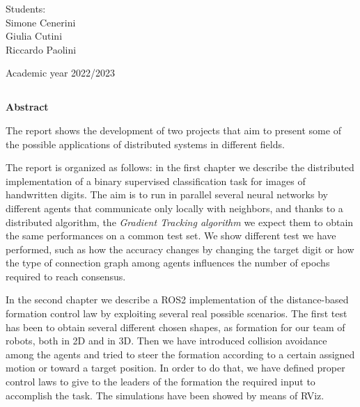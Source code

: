 \documentclass[a4paper,11pt,oneside]{book}
\begin{document}
\begin{flushright}
      {\large Students:}\\
      {Simone Cenerini} \\
      {Giulia Cutini} \\
      {Riccardo Paolini} \\
\end{flushright}        %
\begin{center}
\vfill
      {\large Academic year \@2022/2023} \\
\end{center}



\newpage
\thispagestyle{empty}

\begin{center}
\chapter*{}
\thispagestyle{empty}
{\Huge \textbf{Abstract}}\\
\vspace{15mm}
\end{center}

The report shows the development of two projects that aim to present some of the possible applications of distributed systems in different fields.

\bigskip
The report is organized as follows: in the first chapter we describe the distributed implementation of a binary supervised classification task for images of handwritten digits. The aim is to run in parallel several neural networks by different agents that communicate only locally with neighbors, and thanks to a distributed algorithm, the \textit{Gradient Tracking algorithm} we expect them to obtain the same performances on a common test set. We show different test we have performed, such as how the accuracy changes by changing the target digit or how the type of connection graph among agents influences the number of epochs required to reach consensus.

\bigskip
In the second chapter we describe a ROS2 implementation of the distance-based formation control law by exploiting several real possible scenarios. The first test has been to obtain several different chosen shapes, as formation for our team of robots, both in 2D and in 3D. 
Then we have introduced collision avoidance among the agents and tried to steer the formation according to a certain assigned motion or toward a target position. In order to do that, we have defined proper control laws to give to the leaders of the formation the required input to accomplish the task.
The simulations have been showed by means of RViz.
\end{document}
